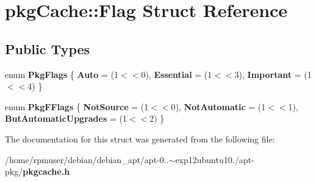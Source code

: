 \section{pkg\-Cache\-:\-:\-Flag \-Struct \-Reference}
\label{structpkgCache_1_1Flag}
\subsection*{\-Public \-Types}
\begin{DoxyCompactItemize}
\item 
enum {\bfseries \-Pkg\-Flags} \{ {\bfseries \-Auto} = (1$<$$<$0), 
{\bfseries \-Essential} = (1$<$$<$3), 
{\bfseries \-Important} = (1$<$$<$4)
 \}
\item 
enum {\bfseries \-Pkg\-F\-Flags} \{ {\bfseries \-Not\-Source} = (1$<$$<$0), 
{\bfseries \-Not\-Automatic} = (1$<$$<$1), 
{\bfseries \-But\-Automatic\-Upgrades} = (1$<$$<$2)
 \}
\end{DoxyCompactItemize}


\-The documentation for this struct was generated from the following file\-:\begin{DoxyCompactItemize}
\item 
/home/rpmuser/debian/debian\-\_\-apt/apt-\/0..$\sim$exp12ubuntu10./apt-\/pkg/{\bf pkgcache.\-h}\end{DoxyCompactItemize}
